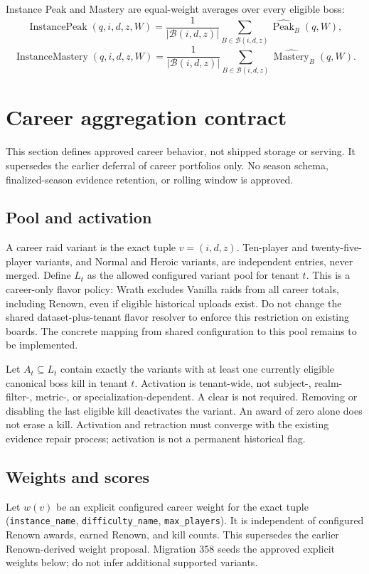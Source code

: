 \documentclass[11pt]{article}
\newcommand{\field}[1]{\texttt{#1}}
\begin{document}
Instance Peak and Mastery are equal-weight averages over every eligible boss:
\[
\operatorname{InstancePeak}(q,i,d,z,W)
=\frac{1}{\lvert\mathcal{B}(i,d,z)\rvert}
\sum_{B\in\mathcal{B}(i,d,z)}
\widehat{\operatorname{Peak}}_B(q,W),
\]
\[
\operatorname{InstanceMastery}(q,i,d,z,W)
=\frac{1}{\lvert\mathcal{B}(i,d,z)\rvert}
\sum_{B\in\mathcal{B}(i,d,z)}
\widehat{\operatorname{Mastery}}_B(q,W).
\]

\section{Career aggregation contract}
This section defines approved career behavior, not shipped storage or serving. It supersedes the earlier deferral of career portfolios only. No season schema, finalized-season evidence retention, or rolling window is approved.

\subsection{Pool and activation}
A career raid variant is the exact tuple $v=(i,d,z)$. Ten-player and twenty-five-player variants, and Normal and Heroic variants, are independent entries, never merged. Define $L_t$ as the allowed configured variant pool for tenant $t$. This is a career-only flavor policy: Wrath excludes Vanilla raids from all career totals, including Renown, even if eligible historical uploads exist. Do not change the shared dataset-plus-tenant flavor resolver to enforce this restriction on existing boards. The concrete mapping from shared configuration to this pool remains to be implemented.

Let $A_t\subseteq L_t$ contain exactly the variants with at least one currently eligible canonical boss kill in tenant $t$. Activation is tenant-wide, not subject-, realm-filter-, metric-, or specialization-dependent. A clear is not required. Removing or disabling the last eligible kill deactivates the variant. An award of zero alone does not erase a kill. Activation and retraction must converge with the existing evidence repair process; activation is not a permanent historical flag.

\subsection{Weights and scores}
Let $w(v)$ be an explicit configured career weight for the exact tuple (\field{instance\_name}, \field{difficulty\_name}, \field{max\_players}). It is independent of configured Renown awards, earned Renown, and kill counts. This supersedes the earlier Renown-derived weight proposal. Migration 358 seeds the approved explicit weights below; do not infer additional supported variants.
\end{document}
